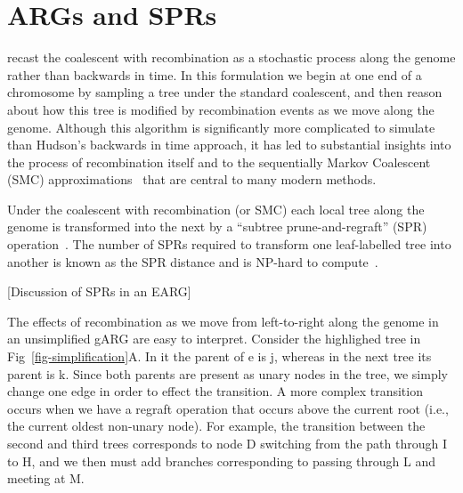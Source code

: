 \documentclass{article}
\begin{document}
\section*{ARGs and SPRs}
\citet{wiuf1999ancestry,wiuf1999recombination} recast
the coalescent with recombination
as a stochastic process along the genome rather than backwards in time.
In this formulation we begin at one end of a chromosome by
sampling a tree under the standard coalescent, and then reason
about how this tree is modified by recombination events
as we move along the genome. Although this algorithm is
significantly more complicated to simulate than Hudson's
backwards in time approach, it has led to substantial
insights into the process of recombination itself
and to the sequentially Markov Coalescent (SMC)
approximations~\citep{mcvean2005approximating,marjoram2006fast}
that are central to many modern methods.

Under the coalescent with recombination (or SMC) each local
tree along the genome is transformed into the next by
a ``subtree prune-and-regraft'' (SPR)
operation~\citep{hein1990reconstructing,song2003on,song2006properties}.
The number of SPRs required to transform one leaf-labelled tree
into another is known as the SPR distance
and is NP-hard to
compute~\citep{hein1996complexity,allen2001subtree,bordewich2005computational}.

[Discussion of SPRs in an EARG]

The effects of recombination as we move from left-to-right along
the genome in an unsimplified gARG are easy to interpret.
Consider the highlighed tree in Fig~\ref{fig-simplification}A.
In it the parent of \textsf{e} is \textsf{j}, whereas in the next tree
its parent is \textsf{k}. Since both parents are present as
unary nodes in the tree, we simply change one edge in
order to effect the transition.
A more complex transition occurs when we have a regraft operation
that occurs above the current root (i.e., the current oldest
non-unary node). For example, the transition between the
second and third trees corresponds to node D switching
from the path through I to H, and we then must add branches
corresponding to passing through L and meeting at M.
\end{document}
